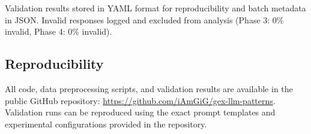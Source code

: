 Validation results stored in YAML format for reproducibility and batch metadata in JSON. Invalid responses logged and excluded from analysis (Phase 3: 0\% invalid, Phase 4: 0\% invalid).

\subsection{Reproducibility}

All code, data preprocessing scripts, and validation results are available in the public GitHub repository: \url{https://github.com/iAmGiG/gex-llm-patterns}. Validation runs can be reproduced using the exact prompt templates and experimental configurations provided in the repository.
